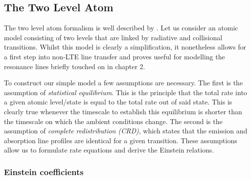 \subsection{The Two Level Atom}
The two level atom formalism is well described by \cite{mihalas}.
Let us consider an atomic model consisting of two levels that are linked 
by radiative and collisional transitions. 
Whilst this model is clearly a simplification, it nonetheless allows
for a first step into non-LTE line transfer and proves useful for modelling
the resonance lines briefly touched on in chapter 2.

To construct our simple model a few assumptions are necessary. The first
is the assumption of {\em statistical equilibrium}. This is the principle 
that the total rate into a given atomic level/state is equal to the 
total rate out of said state. This is clearly true whenever the timescale
to establish this equilibrium is shorter than the timescale on which
the ambient conditions change. The second is the assumption of
{\em complete redistribution (CRD)}, which states that the emission
and absorption line profiles are identical for a given transition. 
These assumptions allow us to formulate rate equations and derive the 
Einstein relations.

\subsubsection{Einstein coefficients}

